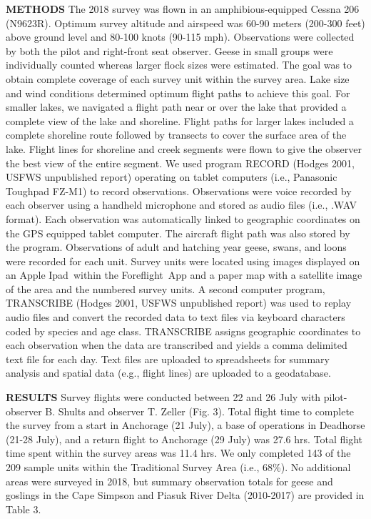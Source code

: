 \documentclass[]{article}
\begin{document}
\textbf{METHODS}\break
The 2018 survey was flown in an amphibious-equipped Cessna 206 (N9623R).
Optimum survey altitude and airspeed was 60-90 meters (200-300 feet)
above ground level and 80-100 knots (90-115 mph). Observations were
collected by both the pilot and right-front seat observer. Geese in
small groups were individually counted whereas larger flock sizes were
estimated. The goal was to obtain complete coverage of each survey unit
within the survey area. Lake size and wind conditions determined optimum
flight paths to achieve this goal. For smaller lakes, we navigated a
flight path near or over the lake that provided a complete view of the
lake and shoreline. Flight paths for larger lakes included a complete
shoreline route followed by transects to cover the surface area of the
lake. Flight lines for shoreline and creek segments were flown to give
the observer the best view of the entire segment. We used program RECORD
(Hodges 2001, USFWS unpublished report) operating on tablet computers
(i.e., Panasonic Toughpad FZ-M1\texttrademark) to record observations.
Observations were voice recorded by each observer using a handheld
microphone and stored as audio files (i.e., .WAV format). Each
observation was automatically linked to geographic coordinates on the
GPS equipped tablet computer. The aircraft flight path was also stored
by the program. Observations of adult and hatching year geese, swans,
and loons were recorded for each unit. Survey units were located using
images displayed on an Apple Ipad\texttrademark~within the
Foreflight\texttrademark~App and a paper map with a satellite image of
the area and the numbered survey units. A second computer program,
TRANSCRIBE (Hodges 2001, USFWS unpublished report) was used to replay
audio files and convert the recorded data to text files via keyboard
characters coded by species and age class. TRANSCRIBE assigns geographic
coordinates to each observation when the data are transcribed and yields
a comma delimited text file for each day. Text files are uploaded to
spreadsheets for summary analysis and spatial data (e.g., flight lines)
are uploaded to a geodatabase.

\setlength{\parskip}{4ex} \textbf{RESULTS}\newline
Survey flights were conducted between 22 and 26 July with pilot-observer
B. Shults and observer T. Zeller (Fig. 3). Total flight time to complete
the survey from a start in Anchorage (21 July), a base of operations in
Deadhorse (21-28 July), and a return flight to Anchorage (29 July) was
27.6 hrs. Total flight time spent within the survey areas was 11.4 hrs.
We only completed 143 of the 209 sample units within the Traditional
Survey Area (i.e., 68\%). No additional areas were surveyed in 2018, but
summary observation totals for geese and goslings in the Cape Simpson
and Piasuk River Delta (2010-2017) are provided in Table 3.
\end{document}
